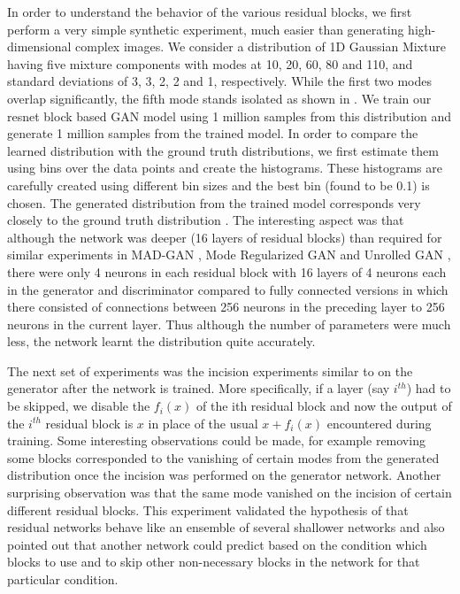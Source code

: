 In order to understand the behavior of the various residual blocks, we first perform a very simple synthetic experiment, much easier than generating high-dimensional complex images. We consider a distribution of 1D Gaussian Mixture \cite{bishop2007pattern} having five mixture components with modes at 10, 20, 60, 80 and 110, and standard deviations of 3, 3, 2, 2 and 1, respectively. While the first two modes overlap significantly, the fifth mode stands isolated as shown in . We train our resnet block based GAN model using 1 million samples from this distribution and generate 1 million samples from the trained model. In order to compare the learned distribution with the ground truth distributions, we first estimate them using bins over the data points and create the histograms. These histograms are carefully created using different bin sizes and the best bin (found to be 0.1) is chosen. The generated distribution from the trained model corresponds very closely to the ground truth distribution . The interesting aspect was that although the network was deeper (16 layers of residual blocks) than required for similar experiments in MAD-GAN \cite{ghosh2017multi}, Mode Regularized GAN \cite{che2016mode} and Unrolled GAN \cite{metz2017unrolledGAN}, there were only 4 neurons in each residual block with 16 layers of 4 neurons each in the generator and discriminator compared to fully connected versions in which there consisted of connections between 256 neurons in the preceding layer to 256 neurons in the current layer. Thus although the number of parameters were much less, the network learnt the distribution quite accurately.

The next set of experiments was the incision experiments similar to \cite{veit2016residual} on the generator after the network is trained. More specifically, if a layer (say $i^{th}$) had to be skipped, we disable the $f_i(x)$ of the ith residual block and now the output of the $i^{th}$ residual block is $x$ in place of the usual $x+f_i(x)$ encountered during training. Some interesting observations could be made, for example removing some blocks corresponded to the vanishing of certain modes from the generated distribution once the incision was performed on the generator network. Another surprising observation was that the same mode vanished on the incision of certain different residual blocks. This experiment validated the hypothesis of \cite{veit2016residual} that residual networks behave like an ensemble of several shallower networks and also pointed out that another network could predict based on the condition which blocks to use and to skip other non-necessary blocks in the network for that particular condition.

